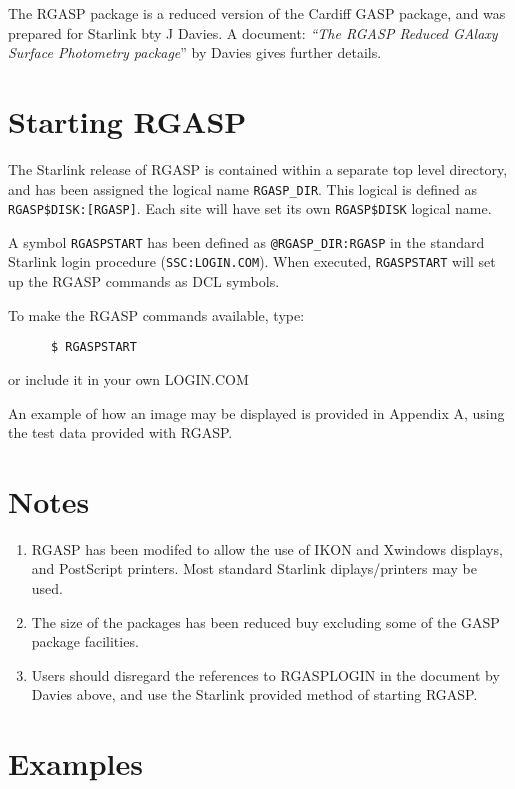 The RGASP package is a reduced version of the Cardiff GASP package, and was
prepared for Starlink bty J Davies. A document: {\it ``The RGASP Reduced GAlaxy
Surface Photometry package}''\/ by Davies gives further details.

\section{Starting RGASP}

The Starlink release of RGASP is contained within a separate top level
directory, and has been assigned the logical name {\tt RGASP\_DIR}. This logical
is defined as {\tt RGASP\$DISK:[RGASP]}. Each site will have set its own
{\tt RGASP\$DISK} logical name.

A symbol {\tt RGASPSTART} has been defined as {\tt @RGASP\_DIR:RGASP} in the
standard Starlink login procedure ({\tt SSC:LOGIN.COM}). When executed,
{\tt RGASPSTART} will set up the RGASP commands as DCL symbols.

To make the RGASP commands available, type:
\begin{verbatim}
      $ RGASPSTART
\end{verbatim}
or include it in your own LOGIN.COM

An example of how an image may be displayed is provided in Appendix A, using
the test data provided with RGASP.

\section{Notes}

\begin{enumerate}
\item RGASP has been modifed to allow the use of IKON and Xwindows displays,
and PostScript printers. Most standard Starlink diplays/printers may be used.

\item The size of the packages has been reduced buy
excluding some of the GASP package facilities.

\item Users should disregard the references to RGASPLOGIN in the document by
Davies above, and use the Starlink provided method of starting RGASP.
\end{enumerate}

\pagebreak
\appendix
\section{Examples}
